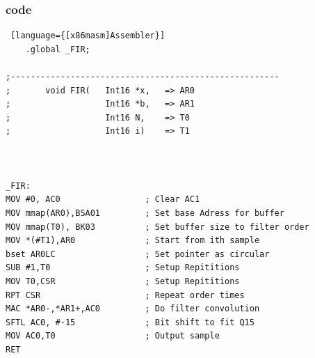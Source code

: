 \subsubsection{code}
\begin{lstlisting} [language={[x86masm]Assembler}]
	.global _FIR;

;------------------------------------------------------
;		void FIR(  	Int16 *x,	=> AR0
;			  		Int16 *b, 	=> AR1
;			   		Int16 N, 	=> T0
;			   		Int16 i)	=> T1



_FIR:	
MOV #0, AC0					; Clear AC1
MOV mmap(AR0),BSA01			; Set base Adress for buffer
MOV mmap(T0), BK03			; Set buffer size to filter order
MOV *(#T1),AR0				; Start from ith sample
bset AR0LC					; Set pointer as circular
SUB #1,T0					; Setup Repititions
MOV T0,CSR					; Setup Repititions
RPT CSR						; Repeat order times
MAC *AR0-,*AR1+,AC0 		; Do filter convolution
SFTL AC0, #-15				; Bit shift to fit Q15
MOV AC0,T0					; Output sample
RET
\end{lstlisting}




